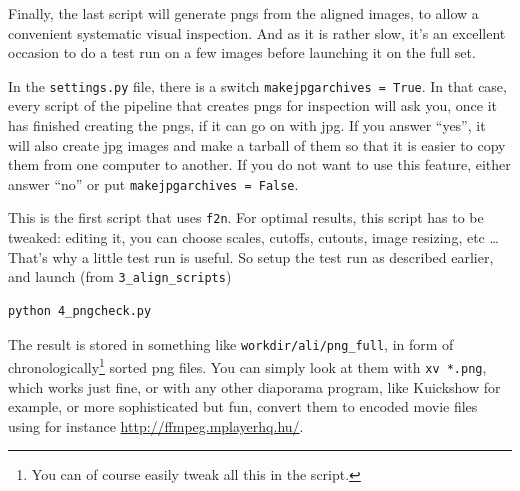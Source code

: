 Finally, the last script will generate pngs from the aligned images, to allow a convenient systematic visual inspection. And as it is rather slow, it's an excellent occasion to do a test run on a few images before launching it on the full set. 

In the \verb+settings.py+ file, there is a switch \verb+makejpgarchives = True+. In that case, every script of the pipeline that creates pngs for inspection will ask you, once it has finished creating the pngs, if it can go on with jpg. If you answer ``yes'', it will also create jpg images and make a tarball of them so that it is easier to copy them from one computer to another. If you do not want to use this feature, either answer ``no'' or put \verb+makejpgarchives = False+.

This is the first script that uses \verb+f2n+. For optimal results, this script has to be tweaked: editing it, you can choose scales, cutoffs, cutouts, image resizing, etc \ldots That's why a little test run is useful. So setup the test run as described earlier, and launch (from \verb+3_align_scripts+)

\begin{Verbatim}
python 4_pngcheck.py
\end{Verbatim}

The result is stored in something like \verb+workdir/ali/png_full+, in form of chronologically\footnote{You can of course easily tweak all this in the script.} sorted png files. You can simply look at them with \verb+xv *.png+, which works just fine, or with any other diaporama program, like Kuickshow for example, or more sophisticated but fun, convert them to encoded movie files using for instance \url{http://ffmpeg.mplayerhq.hu/}. 


